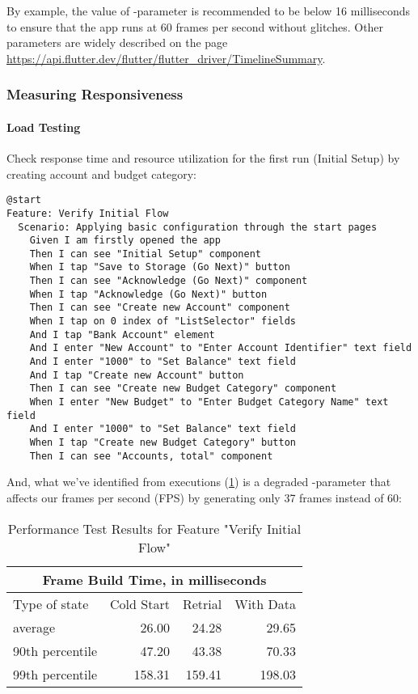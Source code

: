 By example, the value of -parameter is recommended to be below 16 milliseconds to 
ensure that the app runs at 60 frames per second without glitches. Other parameters are widely described on the page
\href{https://api.flutter.dev/flutter/flutter\_driver/TimelineSummary/summaryJson.html}{https://api.flutter.dev/flutter/flutter\_driver/TimelineSummary}.


\subsubsection{Measuring Responsiveness}
\paragraph{Load Testing}
Check response time and resource utilization for the first run (Initial Setup) by creating account and budget 
category:

\begin{lstlisting}[language=cucumber]
@start
Feature: Verify Initial Flow
  Scenario: Applying basic configuration through the start pages
    Given I am firstly opened the app
    Then I can see "Initial Setup" component
    When I tap "Save to Storage (Go Next)" button
    Then I can see "Acknowledge (Go Next)" component
    When I tap "Acknowledge (Go Next)" button
    Then I can see "Create new Account" component
    When I tap on 0 index of "ListSelector" fields
    And I tap "Bank Account" element
    And I enter "New Account" to "Enter Account Identifier" text field
    And I enter "1000" to "Set Balance" text field
    And I tap "Create new Account" button
    Then I can see "Create new Budget Category" component
    When I enter "New Budget" to "Enter Budget Category Name" text field
    And I enter "1000" to "Set Balance" text field
    When I tap "Create new Budget Category" button
    Then I can see "Accounts, total" component
\end{lstlisting}

\noindent And, what we've identified from executions (\cref{tb:frame-build}) is a degraded -parameter 
that affects our frames per second (FPS) by generating only 37 frames instead of 60:\\

\begin{table}[h!]
  \begin{tabular}{ |p{6.8cm}||r|r|r|  }
    \hline
    \multicolumn{4}{|c|}{Frame Build Time, in milliseconds} \\
    \hline
    Type of state & Cold Start & Retrial & With Data\\
    \hline
    average          &  26.00 &  24.28 &  29.65 \\
    90th percentile  &  47.20 &  43.38 &  70.33 \\
    99th percentile  & 158.31 & 159.41 & 198.03 \\
    \hline
  \end{tabular}
  \caption{Performance Test Results for Feature "Verify Initial Flow"} \label{tb:frame-build}
\end{table}

